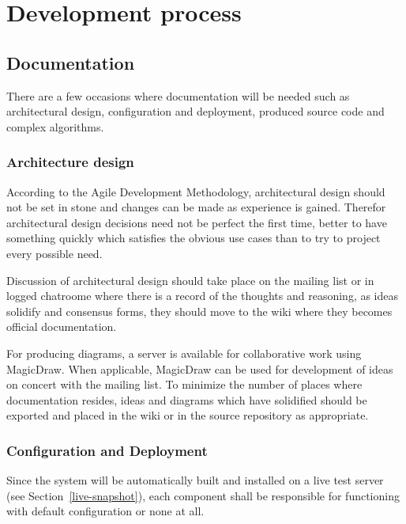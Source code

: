 \chapter{Development process}
\label{ch:development-process}

\section{Documentation}
\label{sec:documentation}

There are a few occasions where documentation will be needed such as architectural design,
configuration and deployment, produced source code and complex algorithms.

\subsection{Architecture design}
\label{sec:architecture-design}

According to the Agile Development Methodology, architectural design should not be set in
stone and changes can be made as experience is gained. Therefor architectural design
decisions need not be perfect the first time, better to have something quickly which
satisfies the obvious use cases than to try to project every possible need.

Discussion of architectural design should take place on the mailing list or in logged
chatroome where there is a record of the thoughts and reasoning, as ideas solidify and
consensus forms, they should move to the wiki where they becomes official documentation.

For producing diagrams, a server is available for collaborative work using MagicDraw.
When applicable, MagicDraw can be used for development of ideas on concert with the
mailing list. To minimize the number of places where documentation resides, ideas and
diagrams which have solidified should be exported and placed in the wiki or in the source
repository as appropriate.


\subsection{Configuration and Deployment}
\label{sec:deployment-process}

Since the system will be automatically built and installed on a live test server
(see Section~\ref{live-snapshot}), each component shall be responsible for functioning
with default configuration or none at all.

